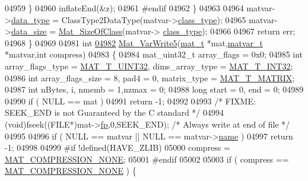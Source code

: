 \begin{DoxyCode}
{{{{{{{{{{{{{{{{{{{{{{{{{{{{{{04959         \}
04960         inflateEnd(&z);
04961 \textcolor{preprocessor}{#endif}
04962     \}
04963 
04964     matvar->\hyperlink{group___m_a_t_ab6aafe9bd77f0f077852593dec438144}{data\_type} = ClassType2DataType(matvar->\hyperlink{group___m_a_t_aff13035bf3265dd7d9425e5d40c839d4}{class\_type});
04965     matvar->\hyperlink{group___m_a_t_a9ad1c82e2b568da617e12dc73a26e1f9}{data\_size} = \hyperlink{group___m_a_t_ga2bf682f015b22fa796a8885e997661e7}{Mat\_SizeOfClass}(matvar->
      \hyperlink{group___m_a_t_aff13035bf3265dd7d9425e5d40c839d4}{class\_type});
04966 
04967     \textcolor{keywordflow}{return} err;
04968 \}
04969 
04981 \textcolor{keywordtype}{int}
\hyperlink{mat5_8c_a4d546a62c4b429d9b94fe873015e6a24}{04982} \hyperlink{mat5_8c_a4d546a62c4b429d9b94fe873015e6a24}{Mat\_VarWrite5}(\hyperlink{struct__mat__t}{mat\_t} *mat,\hyperlink{group___m_a_t_structmatvar__t}{matvar\_t} *matvar,\textcolor{keywordtype}{int} compress)
04983 \{
04984     mat\_uint32\_t array\_flags = 0x0;
04985     \textcolor{keywordtype}{int} array\_flags\_type = \hyperlink{group___m_a_t_ggacf7b3b879282b7ab3a51190e49bf3453aa397e285a23fe240368b752897652c6a}{MAT\_T\_UINT32}, dims\_array\_type = 
      \hyperlink{group___m_a_t_ggacf7b3b879282b7ab3a51190e49bf3453a83e06a68320726c6572bfbb9f3addb1d}{MAT\_T\_INT32};
04986     \textcolor{keywordtype}{int} array\_flags\_size = 8, pad4 = 0, matrix\_type = \hyperlink{group___m_a_t_ggacf7b3b879282b7ab3a51190e49bf3453a32985fee89a4df8db4b3f5d3a48823d3}{MAT\_T\_MATRIX};
04987     \textcolor{keywordtype}{int} nBytes, i, nmemb = 1,nzmax = 0;
04988     \textcolor{keywordtype}{long} start = 0, end = 0;
04989 
04990     \textcolor{keywordflow}{if} ( NULL == mat )
04991         \textcolor{keywordflow}{return} -1;
04992 
04993     \textcolor{comment}{/* FIXME: SEEK\_END is not Guaranteed by the C standard */}
04994     (void)fseek((FILE*)mat->\hyperlink{struct__mat__t_a85f562e407ca9ad4d2a6e14f839432b7}{fp},0,SEEK\_END);         \textcolor{comment}{/* Always write at end of file */}
04995 
04996     \textcolor{keywordflow}{if} ( NULL == matvar || NULL == matvar->\hyperlink{group___m_a_t_a5d4b55b041e3b4fb50c04337f05ad909}{name} )
04997         \textcolor{keywordflow}{return} -1;
04998 
04999 \textcolor{preprocessor}{#if !defined(HAVE\_ZLIB)}
05000     compress = \hyperlink{group___m_a_t_gga768c318af97bd2567758ecb001ceb7f4a2280b97631ff5dd24dec55261dc587b6}{MAT\_COMPRESSION\_NONE};
05001 \textcolor{preprocessor}{#endif}
05002 
05003     \textcolor{keywordflow}{if} ( compress == \hyperlink{group___m_a_t_gga768c318af97bd2567758ecb001ceb7f4a2280b97631ff5dd24dec55261dc587b6}{MAT\_COMPRESSION\_NONE} ) \{
}}}}}}}}}}}}}}}}}}}}}}}}}}}}}}
\end{DoxyCode}
